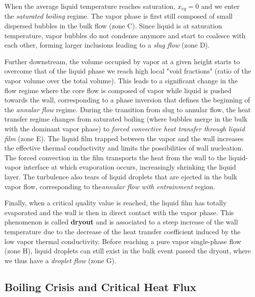 \npar

When the average liquid temperature reaches saturation, $x_{eq} = 0 $ and we enter the \textit{saturated boiling} regime. The vapor phase is first still composed of small dispersed bubbles in the bulk flow (zone C). Since liquid is at saturation temperature, vapor bubbles do not condense anymore and start to coalesce with each other, forming larger inclusions leading to a \textit{slug flow} (zone D).

\npar

Further downstream, the volume occupied by vapor at a given height starts to overcome that of the liquid phase \ie we reach high local "void fractions" (ratio of the vapor volume over the total volume). This leads to a significant change in the flow regime where the core flow is composed of vapor while liquid is pushed towards the wall, corresponding to a phase inversion that defines the beginning of the \textit{annular flow} regime. During the transition from slug to annular flow, the heat transfer regime changes from saturated boiling (where bubbles merge in the bulk with the dominant vapor phase) to \textit{forced convective heat transfer through liquid film} (zone E). The liquid film trapped between the vapor and the wall increases the effective thermal conductivity and limits the possibilities of wall nucleation. The forced convection in the film transports the heat from the wall to the liquid-vapor interface at which evaporation occurs, increasingly shrinking the liquid layer. The turbulence also tears of liquid droplets that are ejected in the bulk vapor flow, corresponding to the\textit{annular flow with entrainment} region.

\npar

Finally, when a critical quality value is reached, the liquid film has totally evaporated and the wall is then in direct contact with the vapor phase. This phenomenon is called \textbf{dryout} and is associated to a steep increase of the wall temperature due to the decrease of the heat transfer coefficient induced by the low vapor thermal conductivity. Before reaching a pure vapor single-phase flow (zone H), liquid droplets can still exist in the bulk event passed the dryout, where we thus have a \textit{droplet flow} (zone G).


\subsection{Boiling Crisis and Critical Heat Flux}


